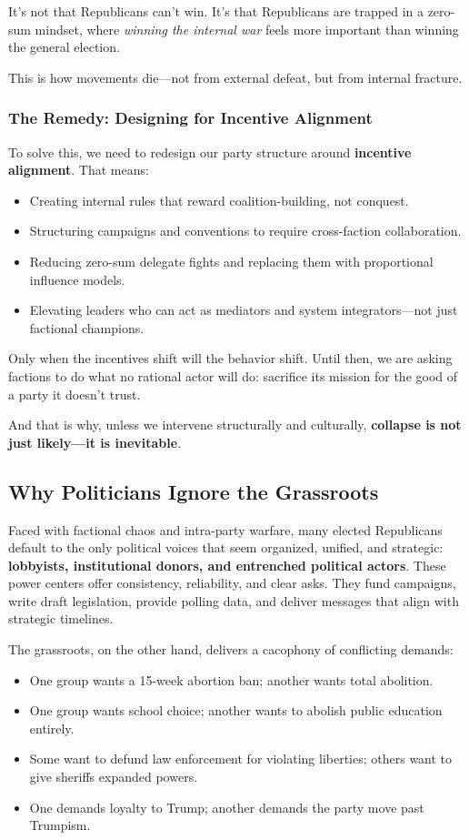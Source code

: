 It’s not that Republicans can’t win. It’s that Republicans are trapped in a zero-sum mindset, where \textit{winning the internal war} feels more important than winning the general election.

This is how movements die—not from external defeat, but from internal fracture.

\subsubsection{The Remedy: Designing for Incentive Alignment}
To solve this, we need to redesign our party structure around \textbf{incentive alignment}. That means:
\begin{itemize}
\item Creating internal rules that reward coalition-building, not conquest.
\item Structuring campaigns and conventions to require cross-faction collaboration.
\item Reducing zero-sum delegate fights and replacing them with proportional influence models.
\item Elevating leaders who can act as mediators and system integrators—not just factional champions.
\end{itemize}

Only when the incentives shift will the behavior shift. Until then, we are asking factions to do what no rational actor will do: sacrifice its mission for the good of a party it doesn’t trust.

And that is why, unless we intervene structurally and culturally, \textbf{collapse is not just likely—it is inevitable}.



\subsection{Why Politicians Ignore the Grassroots}

Faced with factional chaos and intra-party warfare, many elected Republicans default to the only political voices that seem organized, unified, and strategic: \textbf{lobbyists, institutional donors, and entrenched political actors}. These power centers offer consistency, reliability, and clear asks. They fund campaigns, write draft legislation, provide polling data, and deliver messages that align with strategic timelines.

The grassroots, on the other hand, delivers a cacophony of conflicting demands:
\begin{itemize}
\item One group wants a 15-week abortion ban; another wants total abolition.
\item One group wants school choice; another wants to abolish public education entirely.
\item Some want to defund law enforcement for violating liberties; others want to give sheriffs expanded powers.
\item One demands loyalty to Trump; another demands the party move past Trumpism.
\end{itemize}

